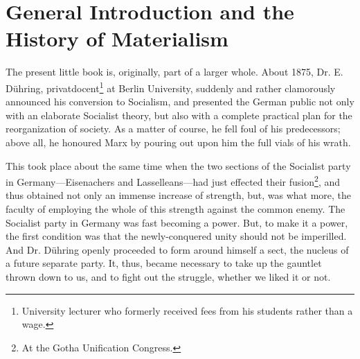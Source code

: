 \chapter{General Introduction and the History of Materialism}

The present little book is, originally, part of a larger whole. About 1875,
Dr. E. Dühring, privatdocent\footnote{University lecturer who formerly received
fees from his students rather than a wage.} at Berlin University, suddenly and
rather clamorously announced his conversion to Socialism, and presented the
German public not only with an elaborate Socialist theory, but also with a
complete practical plan for the reorganization of society. As a matter of
course, he fell foul of his predecessors; above all, he honoured Marx by pouring
out upon him the full vials of his wrath.

This took place about the same time when the two sections of the Socialist
party in Germany---Eisenachers and Lasselleans---had just effected their
fusion\footnote{At the Gotha Unification Congress.}, and thus obtained not only
an immense increase of strength, but, was what more, the faculty of employing
the whole of this strength against the common enemy. The Socialist party in
Germany was fast becoming a power. But, to make it a power, the first condition
was that the newly-conquered unity should not be imperilled. And Dr. Dühring
openly proceeded to form around himself a sect, the nucleus of a future
separate party. It, thus, became necessary to take up the gauntlet thrown
down to us, and to fight out the struggle, whether we liked it or not.

